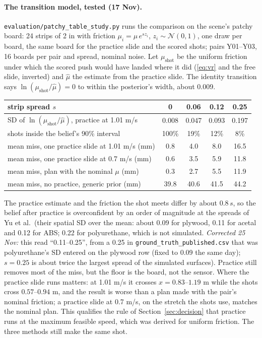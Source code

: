 \documentclass[10pt]{article}
\newcommand{\code}[1]{\texttt{#1}}
\begin{document}
\paragraph{The transition model, tested (17 Nov).}  \code{evaluation/patchy\_table\_study.py} runs the comparison on the
scene's patchy board: 24 strips of 2 in with friction $\mu_i=\mu\,e^{s z_i}$, $z_i\sim\mathcal N(0,1)$, one draw per board,
the same board for the practice slide and the scored shots; pairs Y01--Y03, 16 boards per pair and spread, nominal noise.
Let $\mu_{\text{shot}}$ be the uniform friction under which the scored push would have landed where it did
(\eqref{eq:vr} and the free slide, inverted) and $\hat\mu$ the estimate from the practice slide.  The identity transition
says $\ln(\mu_{\text{shot}}/\hat\mu)=0$ to within the posterior's width, about 0.009.
\begin{center}\small
\begin{tabular}{@{}lcccc@{}}
\toprule
strip spread $s$ & 0 & 0.06 & 0.12 & 0.25\\
\midrule
SD of $\ln(\mu_{\text{shot}}/\hat\mu)$, practice at 1.01 m/s & 0.008 & 0.047 & 0.093 & 0.197\\
shots inside the belief's 90\% interval & 100\% & 19\% & 12\% & 8\%\\
mean miss, one practice slide at 1.01 m/s (mm) & 0.8 & 4.0 & 8.0 & 16.5\\
mean miss, one practice slide at 0.7 m/s (mm) & 0.6 & 3.5 & 5.9 & 11.8\\
mean miss, plan with the nominal $\mu$ (mm) & 0.3 & 2.7 & 5.5 & 11.9\\
mean miss, no practice, generic prior (mm) & 39.8 & 40.6 & 41.5 & 44.2\\
\bottomrule
\end{tabular}
\end{center}
The practice estimate and the friction the shot meets differ by about $0.8\,s$, so the belief after practice is
overconfident by an order of magnitude at the spreads of Yu et al.\ (their spatial SD over the mean: about 0.09 for plywood, 0.11 for acetal and 0.12 for ABS; 0.22 for polyurethane, which is not simulated.  \emph{Corrected 25 Nov:} this read ``0.11--0.25'', from a 0.25 in \code{ground\_truth\_published.csv} that was polyurethane's SD entered on the plywood row (fixed to 0.09 the same day); $s=0.25$ is about twice the largest spread of the simulated surfaces).  Practice still removes most of the
miss, but the floor is the board, not the sensor.  Where the practice slide runs matters: at 1.01 m/s it crosses
$x=0.83$--$1.19$ m while the shots cross $0.57$--$0.94$ m, and the result is worse than a plan made with the pair's nominal
friction; a practice slide at 0.7 m/s, on the stretch the shots use, matches the nominal plan.  This qualifies the rule of
Section~\ref{sec:decision} that practice runs at the maximum feasible speed, which was derived for uniform friction.
The three methods still make the same shot.
\end{document}
